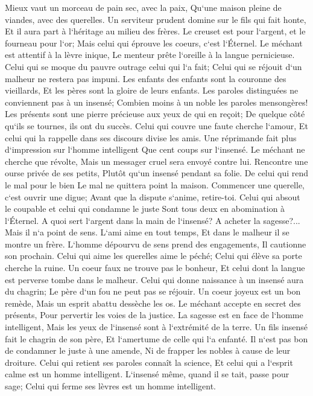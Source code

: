 \verse Mieux vaut un morceau de pain sec, avec la paix, Qu`une maison pleine de viandes, avec des querelles. 
\verse Un serviteur prudent domine sur le fils qui fait honte, Et il aura part à l`héritage au milieu des frères. 
\verse Le creuset est pour l`argent, et le fourneau pour l`or; Mais celui qui éprouve les coeurs, c`est l`Éternel. 
\verse Le méchant est attentif à la lèvre inique, Le menteur prête l`oreille à la langue pernicieuse. 
\verse Celui qui se moque du pauvre outrage celui qui l`a fait; Celui qui se réjouit d`un malheur ne restera pas impuni. 
\verse Les enfants des enfants sont la couronne des vieillards, Et les pères sont la gloire de leurs enfants. 
\verse Les paroles distinguées ne conviennent pas à un insensé; Combien moins à un noble les paroles mensongères! 
\verse Les présents sont une pierre précieuse aux yeux de qui en reçoit; De quelque côté qu`ils se tournes, ils ont du succès. 
\verse Celui qui couvre une faute cherche l`amour, Et celui qui la rappelle dans ses discours divise les amis. 
\verse Une réprimande fait plus d`impression sur l`homme intelligent Que cent coups sur l`insensé. 
\verse Le méchant ne cherche que révolte, Mais un messager cruel sera envoyé contre lui. 
\verse Rencontre une ourse privée de ses petits, Plutôt qu`un insensé pendant sa folie. 
\verse De celui qui rend le mal pour le bien Le mal ne quittera point la maison. 
\verse Commencer une querelle, c`est ouvrir une digue; Avant que la dispute s`anime, retire-toi. 
\verse Celui qui absout le coupable et celui qui condamne le juste Sont tous deux en abomination à l`Éternel. 
\verse A quoi sert l`argent dans la main de l`insensé? A acheter la sagesse?... Mais il n`a point de sens. 
\verse L`ami aime en tout temps, Et dans le malheur il se montre un frère. 
\verse L`homme dépourvu de sens prend des engagements, Il cautionne son prochain. 
\verse Celui qui aime les querelles aime le péché; Celui qui élève sa porte cherche la ruine. 
\verse Un coeur faux ne trouve pas le bonheur, Et celui dont la langue est perverse tombe dans le malheur. 
\verse Celui qui donne naissance à un insensé aura du chagrin; Le père d`un fou ne peut pas se réjouir. 
\verse Un coeur joyeux est un bon remède, Mais un esprit abattu dessèche les os. 
\verse Le méchant accepte en secret des présents, Pour pervertir les voies de la justice. 
\verse La sagesse est en face de l`homme intelligent, Mais les yeux de l`insensé sont à l`extrémité de la terre. 
\verse Un fils insensé fait le chagrin de son père, Et l`amertume de celle qui l`a enfanté. 
\verse Il n`est pas bon de condamner le juste à une amende, Ni de frapper les nobles à cause de leur droiture. 
\verse Celui qui retient ses paroles connaît la science, Et celui qui a l`esprit calme est un homme intelligent. 
\verse L`insensé même, quand il se tait, passe pour sage; Celui qui ferme ses lèvres est un homme intelligent. 

